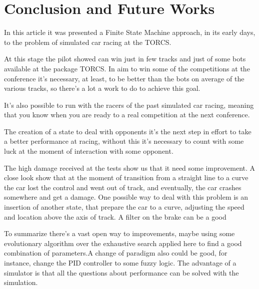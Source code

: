 \section{Conclusion and Future Works}

	In this article it was presented a Finite State Machine approach, in its early days, to the problem of simulated car racing at the TORCS.
	
	At this stage the pilot showed can win just in few tracks and just of some bots available at the package TORCS. In aim to win some of the competitions at the conference it's necessary, at least, to be better than the bots on average of the various tracks, so there's a lot a work to do to achieve this goal. 
	
	It's also possible to run with the racers of the past simulated car racing, meaning that you know when you are ready to a real competition at the next conference.
	
	The creation of a state to deal with opponents it's the next step in effort to take a better performance at racing, without this it's necessary to count with some luck at the moment of interaction with some opponent.
	
	
	The high damage received at the tests show us that it need some improvement. A close look show that at the moment of transition from a straight line to a curve the car lost the control and went out of track, and eventually, the car crashes somewhere and get a damage. One possible way to deal with this problem is an insertion of another state, that prepare the car to a curve, adjusting the speed and location above the axis of track. A filter on the brake can be a good 
	
	To summarize there's a vast open way to improvements, maybe using some evolutionary algorithm over the exhaustive search applied here to find a good combination of parameters.A change of paradigm also could be good, for instance, change the PID controller to some fuzzy logic. The advantage of a simulator is that all the questions about performance can be solved with the simulation.

